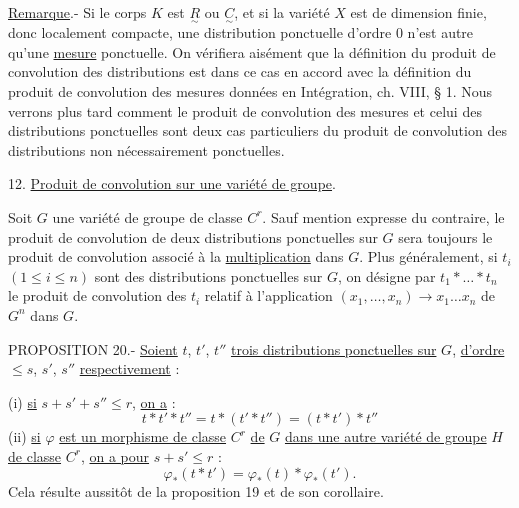 \par\noindent
{}
\par
{}


\uline{Remarque}.- Si le corps $K$ est $\underset{\sim}{R}$ ou $\underset{\sim}{C}$, et si la variété $X$ est de dimension finie, donc localement compacte, une distribution ponctuelle d'ordre $0$ n'est autre qu'une \uline{mesure} ponctuelle. On vérifiera aisément que la définition du produit de convolution des distributions est dans ce cas en accord avec la définition du produit de convolution des mesures données en Intégration, ch. VIII, § 1. Nous verrons plus tard comment le produit de convolution des mesures et celui des distributions ponctuelles sont deux cas particuliers du produit de convolution des distributions non nécessairement ponctuelles.

12. \uline{Produit de convolution sur une variété de groupe}.

Soit $G$ une variété de groupe de classe $C^r$. Sauf mention expresse du contraire, le produit de convolution de deux distributions ponctuelles sur $G$ sera toujours le produit de convolution associé à la \uline{multiplication} dans $G$. Plus généralement, si $t_i$ $(1\leq i\leq n)$ sont des distributions ponctuelles sur $G$, on désigne par $t_1*\ldots*t_n$ le produit de convolution des $t_i$ relatif à l'application $(x_1,\ldots,x_n)\longrightarrow x_1\ldots x_n$ de $G^n$ dans $G$.

PROPOSITION 20.- \uline{Soient} $t$, $t'$, $t''$ \uline{trois distributions ponctuelles sur} $G$, \uline{d'ordre} $\leq s$, $s'$, $s''$ \uline{respectivement} :

(i) \uline{si} $s+s'+s''\leq r$, \uline{on a} :
\[
t*t'*t''=t*(t'*t'')=(t*t')*t''
\]
(ii) \uline{si} $\varphi$ \uline{est un morphisme de classe} $C^r$ \uline{de} $G$ \uline{dans une autre variété de groupe} $H$ \uline{de classe} $C^r$, \uline{on a pour} $s+s'\leq r$ :
\[
\varphi_*(t*t')=\varphi_*(t)*\varphi_*(t').
\]
Cela résulte aussitôt de la proposition 19 et de son corollaire.

